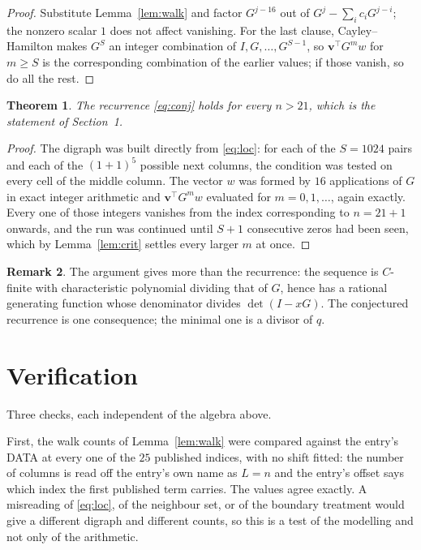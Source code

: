 \documentclass[11pt,a4paper]{article}
\theoremstyle{plain}
\newtheorem{theorem}{Theorem}
\theoremstyle{definition}
\newtheorem{remark}[theorem]{Remark}
\begin{document}
\begin{proof}
Substitute Lemma~\ref{lem:walk} and factor $G^{j-16}$ out of
$G^{j}-\sum_ic_iG^{j-i}$; the nonzero scalar $1$ does not affect
vanishing. For the last clause, Cayley--Hamilton makes $G^{S}$ an integer combination of
$I,G,\dots,G^{S-1}$, so $\mathbf{v}^{\!\top}G^{m}w$ for $m\ge S$ is the corresponding
combination of the earlier values; if those vanish, so do all the rest.
\end{proof}

\begin{theorem}
The recurrence \eqref{eq:conj} holds for every $n>21$, which is the statement of
Section~1.
\end{theorem}

\begin{proof}
The digraph was built directly from \eqref{eq:loc}: for each of the $S=1024$ pairs and each
of the $(1+1)^{5}$ possible next columns, the condition was tested on every cell of
the middle column. The vector $w$ was formed by $16$ applications of $G$ in exact integer
arithmetic and $\mathbf{v}^{\!\top}G^{m}w$ evaluated for $m=0,1,\dots$, again exactly.
Every one of those integers vanishes from the index corresponding to $n=21+1$ onwards,
and the run was continued until $S+1$ consecutive zeros had been seen, which by
Lemma~\ref{lem:crit} settles every larger $m$ at once.
\end{proof}

\begin{remark}
The argument gives more than the recurrence: the sequence is $C$-finite with characteristic
polynomial dividing that of $G$, hence has a rational generating function whose denominator
divides $\det(I-xG)$. The conjectured recurrence is one consequence; the minimal one is a
divisor of $q$.
\end{remark}

\section{Verification}

Three checks, each independent of the algebra above.

First, the walk counts of Lemma~\ref{lem:walk} were compared against the entry's DATA at
every one of the $25$ published indices, with no shift fitted: the number of columns is
read off the entry's own name as $L=n$ and the entry's offset says which index the first
published term carries. The values agree exactly. A misreading of \eqref{eq:loc}, of the
neighbour set, or of the boundary treatment would give a different digraph and different
counts, so this is a test of the modelling and not only of the arithmetic.
\end{document}
